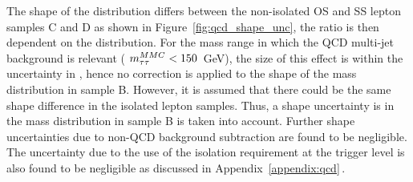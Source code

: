 

The shape of the \mmc distribution differs between the non-isolated  OS and SS lepton samples C and D as shown in Figure~\ref{fig:qcd_shape_unc},
the ratio \rqcd is then dependent on the \mmc distribution.
For the mass range in which the QCD multi-jet background is relevant ( $m_{\tau\tau}^{MMC}  < 150$~GeV),
the size of this effect is within the uncertainty in  \rqcd,  hence no correction is applied to the shape of the mass distribution
in sample B. However, it is assumed that there could be the same 
shape difference in the isolated lepton samples. Thus, a shape uncertainty is  in the mass distribution in 
sample B is taken into account. Further 
shape uncertainties due to non-QCD background subtraction are found to be negligible. The uncertainty due to the use of the isolation 
requirement at the trigger level is also found to be negligible as discussed in Appendix~\ref{appendix:qcd}\,.




